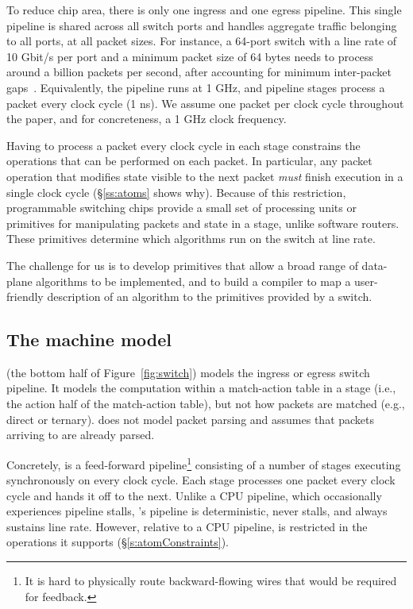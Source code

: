To reduce chip area, there is only one ingress and one egress pipeline.  This
single pipeline is shared across all switch ports and handles aggregate traffic
belonging to all ports, at all packet sizes.  For instance, a 64-port switch
with a line rate of 10 Gbit/s per port and a minimum packet size of 64 bytes
needs to process around a billion packets per second, after accounting for
minimum inter-packet gaps~\cite{rmt}.  Equivalently, the pipeline runs at 1
GHz, and pipeline stages process a packet every clock cycle (1 ns).  We assume
one packet per clock cycle throughout the paper, and for concreteness, a
1 GHz clock frequency.

Having to process a packet every clock cycle in each stage constrains
the operations that can be performed on each packet. In particular, any packet
operation that modifies state visible to the next packet {\em must} finish
execution in a single clock cycle (\S\ref{ss:atoms} shows why). Because
of this restriction, programmable switching chips provide a small set of
processing units or primitives for manipulating packets and state in a stage,
unlike software routers. These primitives determine which algorithms
run on the switch at line rate.

The challenge for us is to develop primitives that allow a broad range of
data-plane algorithms to be implemented, and to build a compiler to map a
user-friendly description of an algorithm to the primitives provided by a
switch.

\subsection{The \absmachine machine model}

\absmachine (the bottom half of Figure~\ref{fig:switch}) models
the ingress or egress switch pipeline.  It models the
computation within a match-action table in a stage (i.e., the action half of
the match-action table), but not how packets are matched (e.g., direct or
ternary). \absmachine does not model packet parsing and assumes
that packets arriving to \absmachine are already parsed.

 Concretely, \absmachine is a feed-forward pipeline\footnote{It is hard to
physically route backward-flowing wires that would be required for feedback.}
consisting of a number of stages executing synchronously on every clock cycle.
Each stage processes one packet every clock cycle and hands it off to the next.
Unlike a CPU pipeline, which occasionally experiences pipeline stalls,
\absmachine's pipeline is deterministic, never stalls, and always sustains line
rate. However, relative to a CPU pipeline, \absmachine is restricted in the
operations it supports (\S\ref{s:atomConstraints}).

